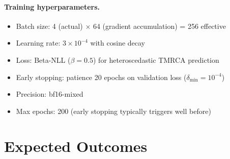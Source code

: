 \documentclass[11pt,a4paper]{article}
\begin{document}
\paragraph{Training hyperparameters.}
\begin{itemize}[nosep]
  \item Batch size: 4 (actual) $\times$ 64 (gradient accumulation) = 256 effective
  \item Learning rate: $3\times10^{-4}$ with cosine decay
  \item Loss: Beta-NLL ($\beta=0.5$) for heteroscedastic TMRCA prediction
  \item Early stopping: patience 20 epochs on validation loss ($\delta_{\min}=10^{-4}$)
  \item Precision: bf16-mixed
  \item Max epochs: 200 (early stopping typically triggers well before)
\end{itemize}

\section{Expected Outcomes}
\end{document}
